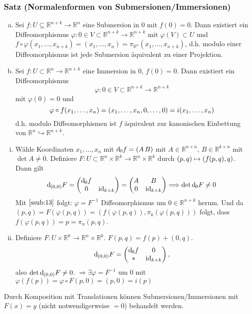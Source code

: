 \subsubsection{Satz (Normalenformen von Submersionen/Immersionen)} %
\label{ssub:15}
\begin{enumerate}[a)]
	\item Sei $f : U \subseteq \mathds{R}^{n+k} \to \mathds{R}^n$ eine Submersion in $0$ mit $f(0)=0$. Dann existiert ein Diffeomorphismus 
	$\varphi : 0 \in V \subset \mathds{R}^{n+k} \to \mathds{R}^{n+k}$ mit $\varphi(V) \subset U$ und 
	$f \circ \varphi(x_1, \ldots , x_{n+k}) = (x_1, \ldots , x_n) = \pi_{\mathds{R}^n}(x_1, \ldots , x_{n+k})$, d.h. modulo einer Diffeomorphismus ist jede Submersion 
	äquivalent zu einer Projektion.
	\item Sei $f : U \subset \mathds{R}^n \to \mathds{R}^{n+k}$ eine Immersion in $0$, $f(0)=0$. Dann existiert ein Diffeomorphismus 
	\[
		\varphi : 0 \in V \subset \mathds{R}^{n+k} \to \mathds{R}^{n+k}
	\]
	mit $\varphi(0)=0$ und 
	\[
		\varphi \circ f (x_1, \ldots ,x _n) = \enbrace*{x_1, \ldots , x_n, 0 , \ldots , 0} = i(x_1, \ldots , x_n) 
	\]
	d.h. modulo Diffeomorphismen ist $f$ äquivalent zur kanonischen Einbettung von $\mathds{R}^n \hookrightarrow \mathds{R}^{n+k}$.
\end{enumerate}
\begin{enumerate}[(i)]
	\item Wähle Koordinaten $x_1, \ldots , x_n$ mit $\mathd_0 f = (A \, B)$ mit $A \in \mathds{R}^{n \times n}$, $B \in \mathds{R}^{k \times n}$ mit $\det A \not= 0$.
	Definiere $F : U \subset \mathds{R}^n \times \mathds{R}^k \to \mathds{R}^n \times \mathds{R}^k $ durch $(p,q) \mapsto \enbrace*{f(p,q), q}$. Dann gilt
	\[
		\mathd_{(0,0)} F = \begin{pmatrix}
			\mathd_0 f & \\
			0 & \id_{k \times k}
		\end{pmatrix} = \begin{pmatrix}
			A & B \\
			0 & \id_{k \times k} 
		\end{pmatrix}
		\Longrightarrow \det \mathd_0 F \not= 0
	\]
	Mit $\ref{ssub:13}$ folgt: $\varphi = F ^{-1}$ Diffeomorphismus um $0 \in \mathds{R}^{n+k}$ herum. Und da $(p,q) = F(\varphi(p,q)) = (f(\varphi(p,q)),\pi_k (\varphi(p,q)))$ folgt, dass $f(\varphi(p,q)) = p = \pi_n (p,q)$. 
	\item Definiere $F : U \times \mathds{R}^k \to \mathds{R}^n \times \mathds{R}^k$. $F(p,q) = f(p)+ (0,q)$.
	\[
		\mathd_{(0,0)} F = \begin{pmatrix}
			\mathd_0 f & 0 \\
			* & \id_{k \times k}
		\end{pmatrix},
	\]
	also $\det \mathd_{(0,0)} F \not= 0$. $\Rightarrow  \exists \varphi = F ^{-1}$ um $0$ mit $\varphi(f(p))=\varphi \circ F (p,0) = (p,0) = i(p)$ \bewende
\end{enumerate}
Durch Komposition mit Translationen können Submersionen/Immersionen mit $F(x)=y$ (nicht notwendigerweise $=0$) behandelt werden.

